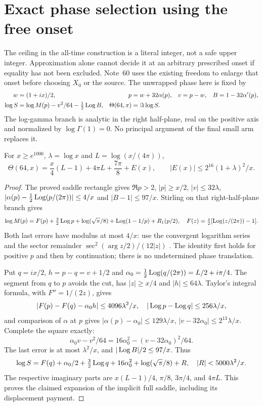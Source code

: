 \section{Exact phase selection using the free onset}
\label{sec:effective-phase}
The ceiling in the all-time construction is a literal integer, not a
safe upper integer. Approximation alone cannot decide it at an arbitrary
prescribed onset if equality has not been excluded. Note~60 \cite{n60}
uses the existing freedom to enlarge that onset before choosing $X_0$
or the source. The unwrapped phase here is fixed by
\begin{align}
 w&=(1+ix)/2,&p&=w+32\alpha(p),&v&=p-w,&B&=1-32\alpha'(p),\notag\\
 \log S&=\log M(p)-v^2/64-\tfrac12\operatorname{Log} B,&
 \Theta(64,x)&=\Im\log S.
 \label{eq:pi-normalization}
\end{align}
The log-gamma branch is analytic in the right half-plane, real on the
positive axis and normalized by $\log\Gamma(1)=0$. No principal
argument of the final small arm replaces it.

\begin{lemma}\label{lem:pi-phase}
For $x\ge e^{1000}$, $\lambda=\log x$ and $L=\log(x/(4\pi))$,
\begin{equation}
 \Theta(64,x)=\frac x4(L-1)+4\pi L+\frac{7\pi}8+E(x),\qquad
 |E(x)|\le2^{16}(1+\lambda)^2/x.
 \label{eq:pi-expansion}
\end{equation}
\end{lemma}
\begin{proof}
The proved saddle rectangle gives $\Re p>2$, $|p|\ge x/2$,
$|v|\le32\lambda$,
$|\alpha(p)-\frac12\operatorname{Log}(p/(2\pi))|\le4/x$ and
$|B-1|\le97/x$. Stirling on that right-half-plane branch gives
\[
 \log M(p)=F(p)+\tfrac32\operatorname{Log} p+\log(\sqrt\pi/8)
                       +\operatorname{Log}(1-1/p)+R_1(p/2),
 \quad F(z)=\tfrac z2[\operatorname{Log}(z/(2\pi))-1].
\]
Both last errors have modulus at most $4/x$: use the convergent
logarithm series and the sector remainder
$\sec^2(\arg z/2)/(12|z|)$ \cite{DLMFGammaOuter2026}.
The identity first holds for positive $p$ and then by continuation;
there is no undetermined phase translation.

Put $q=ix/2$, $h=p-q=v+1/2$ and
$\alpha_0=\frac12\operatorname{Log}(q/(2\pi))=L/2+i\pi/4$. The segment from
$q$ to $p$ avoids the cut, has $|z|\ge x/4$ and $|h|\le64\lambda$.
Taylor's integral formula, with $F''=1/(2z)$, gives
\[
 |F(p)-F(q)-\alpha_0h|\le4096\lambda^2/x,\quad
 |\operatorname{Log} p-\operatorname{Log} q|\le256\lambda/x,
\]
and comparison of $\alpha$ at $p$ gives
$|\alpha(p)-\alpha_0|\le129\lambda/x$,
$|v-32\alpha_0|\le2^{13}\lambda/x$. Complete the square exactly:
\[
 \alpha_0v-v^2/64=16\alpha_0^2-(v-32\alpha_0)^2/64.
\]
The last error is at most $\lambda^2/x$, and
$|\operatorname{Log} B|/2\le97/x$. Thus
\[
 \log S=F(q)+\alpha_0/2+\tfrac32\operatorname{Log} q+16\alpha_0^2
                          +\log(\sqrt\pi/8)+R,
 \quad |R|<5000\lambda^2/x.
\]
The respective imaginary parts are $x(L-1)/4$, $\pi/8$,
$3\pi/4$, and $4\pi L$. This proves the claimed expansion of the
implicit full saddle, including its displacement payment.
\end{proof}

